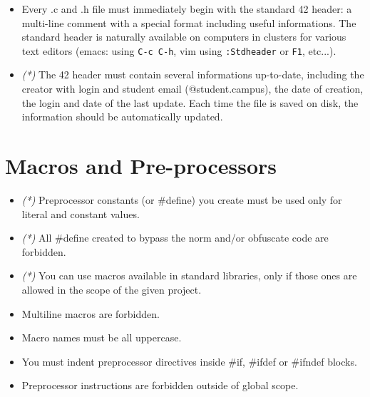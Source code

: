 \documentclass{42-en}
\begin{document}
        \begin{itemize}

        \item Every .c and .h file must immediately begin with the standard 42 header:
          a multi-line comment with a special format including useful informations. The
          standard header is naturally available on computers in clusters for various
          text editors (emacs: using \texttt{C-c C-h}, vim using \texttt{:Stdheader} or
          \texttt{F1}, etc...).

        \item \textit{(*)} The 42 header must contain several informations up-to-date, including the
          creator with login and student email (@student.campus), the date of creation,
          the login and date of the last update. Each time the file is saved on disk,
          the information should be automatically updated.

        \end{itemize}
        
        \newpage


    \section{Macros and Pre-processors}

        \begin{itemize}

            \item \textit{(*)} Preprocessor constants (or \#define) you create must be used
                only for literal and constant values.
            \item \textit{(*)} All \#define created to bypass the norm and/or obfuscate
                code are forbidden.
            \item \textit{(*)} You can use macros available in standard libraries, only
                if those ones are allowed in the scope of the given project.
            \item Multiline macros are forbidden.
            \item Macro names must be all uppercase.
            \item You must indent preprocessor directives inside \#if, \#ifdef
                or \#ifndef blocks.
            \item Preprocessor instructions are forbidden outside of global scope.

        \end{itemize}
        \newpage
\end{document}
